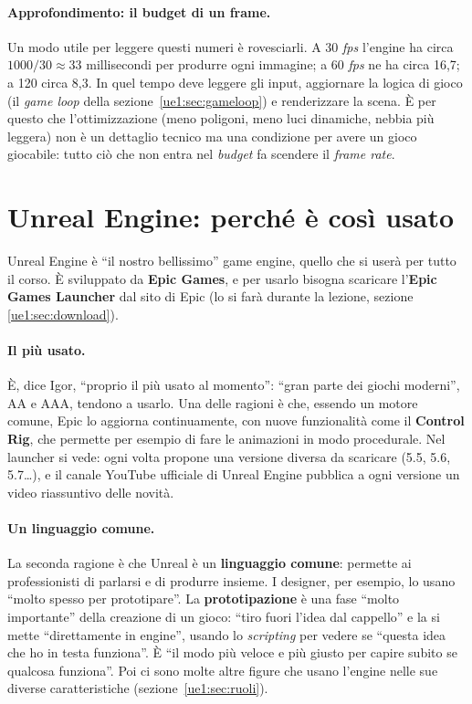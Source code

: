 \paragraph{Approfondimento: il budget di un frame.} Un modo utile per leggere questi
numeri è rovesciarli. A 30 \emph{fps} l'engine ha circa $1000/30 \approx 33$
millisecondi per produrre ogni immagine; a 60 \emph{fps} ne ha circa 16,7; a 120 circa
8,3. In quel tempo deve leggere gli input, aggiornare la logica di gioco (il
\emph{game loop} della sezione~\ref{ue1:sec:gameloop}) e renderizzare la scena. È per
questo che l'ottimizzazione (meno poligoni, meno luci dinamiche, nebbia più leggera)
non è un dettaglio tecnico ma una condizione per avere un gioco giocabile: tutto ciò che
non entra nel \emph{budget} fa scendere il \emph{frame rate}.

\section{Unreal Engine: perché è così usato}
\label{ue1:sec:unreal}

Unreal Engine è ``il nostro bellissimo'' game engine, quello che si userà per tutto il
corso. È sviluppato da \textbf{Epic Games}, e per usarlo bisogna scaricare
l'\textbf{Epic Games Launcher} dal sito di Epic (lo si farà durante la lezione, sezione
\ref{ue1:sec:download}).

\paragraph{Il più usato.} È, dice Igor, ``proprio il più usato al momento'': ``gran parte
dei giochi moderni'', AA e AAA, tendono a usarlo. Una delle ragioni è che, essendo un
motore comune, Epic lo aggiorna continuamente, con nuove funzionalità come il
\textbf{Control Rig}, che permette per esempio di fare le animazioni in modo
procedurale. Nel launcher si vede: ogni volta propone una versione diversa da scaricare
(5.5, 5.6, 5.7\ldots), e il canale YouTube ufficiale di Unreal Engine pubblica a ogni
versione un video riassuntivo delle novità.

\paragraph{Un linguaggio comune.} La seconda ragione è che Unreal è un \textbf{linguaggio
comune}: permette ai professionisti di parlarsi e di produrre insieme. I designer, per
esempio, lo usano ``molto spesso per prototipare''. La \textbf{prototipazione} è una
fase ``molto importante'' della creazione di un gioco: ``tiro fuori l'idea dal
cappello'' e la si mette ``direttamente in engine'', usando lo \emph{scripting} per
vedere se ``questa idea che ho in testa funziona''. È ``il modo più veloce e più giusto
per capire subito se qualcosa funziona''. Poi ci sono molte altre figure che usano
l'engine nelle sue diverse caratteristiche (sezione~\ref{ue1:sec:ruoli}).

